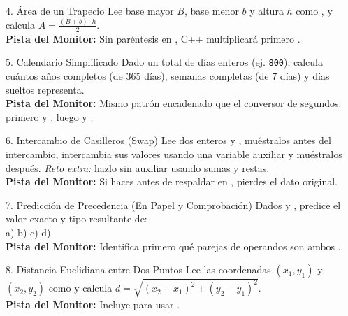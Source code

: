 \documentclass[11pt,letterpaper]{article}
\begin{document}
\begin{ejercicio}{4. Área de un Trapecio}
Lee base mayor $B$, base menor $b$ y altura $h$ como , y calcula $A = \frac{(B + b)\cdot h}{2}$.\\
\textbf{Pista del Monitor:} Sin paréntesis en , C++ multiplicará primero .
\end{ejercicio}

\begin{ejercicio}{5. Calendario Simplificado}
Dado un total de días enteros (ej. \texttt{800}), calcula cuántos años completos (de 365 días), semanas completas (de 7 días) y días sueltos representa.\\
\textbf{Pista del Monitor:} Mismo patrón encadenado que el conversor de segundos: primero  y , luego  y .
\end{ejercicio}

\begin{ejercicio}{6. Intercambio de Casilleros (Swap)}
Lee dos enteros  y , muéstralos antes del intercambio, intercambia sus valores usando una variable auxiliar  y muéstralos después. \emph{Reto extra:} hazlo sin auxiliar usando sumas y restas.\\
\textbf{Pista del Monitor:} Si haces  antes de respaldar  en , pierdes el dato original.
\end{ejercicio}

\begin{ejercicio}{7. Predicción de Precedencia (En Papel y Comprobación)}
Dados  y , predice el valor exacto y tipo resultante de:\\
a)  \quad b)  \quad c)  \quad d) \\
\textbf{Pista del Monitor:} Identifica primero qué parejas de operandos son ambos .
\end{ejercicio}

\begin{ejercicio}{8. Distancia Euclidiana entre Dos Puntos}
Lee las coordenadas $(x_1, y_1)$ y $(x_2, y_2)$ como  y calcula $d = \sqrt{(x_2 - x_1)^2 + (y_2 - y_1)^2}$.\\
\textbf{Pista del Monitor:} Incluye  para usar .
\end{ejercicio}
\end{document}
